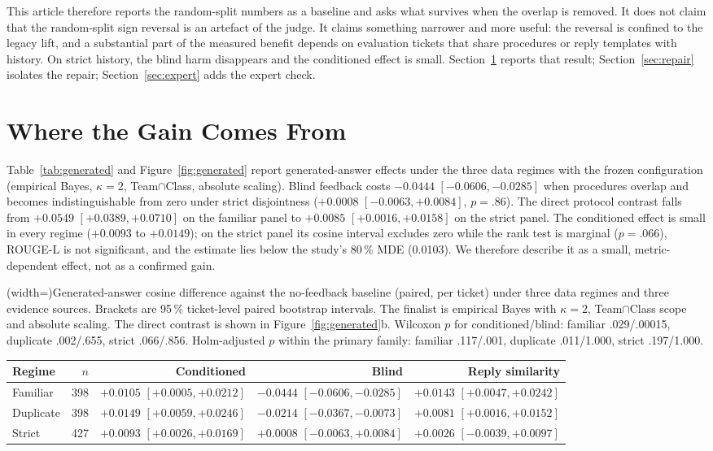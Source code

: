 \documentclass{ieeeaccess}
\begin{document}
This article therefore reports the random-split numbers as a baseline and asks what
survives when the overlap is removed. It does not claim that the random-split sign
reversal is an artefact of the judge. It claims something narrower and more useful:
the reversal is confined to the legacy lift, and a substantial part of the measured
benefit depends on evaluation tickets that share procedures or reply templates with
history. On strict history, the blind harm disappears and the conditioned effect is
small. Section~\ref{sec:regime} reports that result; Section~\ref{sec:repair}
isolates the repair; Section~\ref{sec:expert} adds the expert check.


\section{Where the Gain Comes From}
\label{sec:regime}

Table~\ref{tab:generated} and Figure~\ref{fig:generated} report generated-answer
effects under the three data regimes with the frozen configuration (empirical Bayes,
$\kappa=2$, Team$\cap$Class, absolute scaling). Blind feedback costs $-0.0444$
$[-0.0606,-0.0285]$ when procedures overlap and becomes indistinguishable from zero
under strict disjointness ($+0.0008$ $[-0.0063,+0.0084]$, $p=.86$). The direct
protocol contrast falls from $+0.0549$ $[+0.0389,+0.0710]$ on the familiar panel to
$+0.0085$ $[+0.0016,+0.0158]$ on the strict panel. The conditioned effect is small
in every regime ($+0.0093$ to $+0.0149$); on the strict panel its cosine interval
excludes zero while the rank test is marginal ($p=.066$), ROUGE-L is not
significant, and the estimate lies below the study's 80\,\% MDE (0.0103). We
therefore describe it as a small, metric-dependent effect, not as a confirmed gain.

\Table[!btp](width=\textwidth){Generated-answer cosine difference against the
no-feedback baseline (paired, per ticket) under three data regimes and three
evidence sources. Brackets are 95\,\% ticket-level paired bootstrap intervals. The
finalist is empirical Bayes with $\kappa=2$, Team$\cap$Class scope and absolute
scaling. The direct contrast is shown in Figure~\ref{fig:generated}b. Wilcoxon $p$
for conditioned/blind: familiar .029/.00015, duplicate .002/.655, strict
.066/.856. Holm-adjusted $p$ within the primary family: familiar .117/.001,
duplicate .011/1.000, strict .197/1.000.\label{tab:generated}}{
\begin{tabular}{@{}lrrrr@{}}
\toprule
Regime & $n$ & Conditioned & Blind & Reply similarity \\
\midrule
Familiar  & 398 & $+0.0105$ $[+0.0005, +0.0212]$ & $-0.0444$ $[-0.0606, -0.0285]$ & $+0.0143$ $[+0.0047, +0.0242]$ \\
Duplicate & 398 & $+0.0149$ $[+0.0059, +0.0246]$ & $-0.0214$ $[-0.0367, -0.0073]$ & $+0.0081$ $[+0.0016, +0.0152]$ \\
Strict    & 427 & $+0.0093$ $[+0.0026, +0.0169]$ & $+0.0008$ $[-0.0063, +0.0084]$ & $+0.0026$ $[-0.0039, +0.0097]$ \\
\bottomrule
\end{tabular}}
\end{document}
